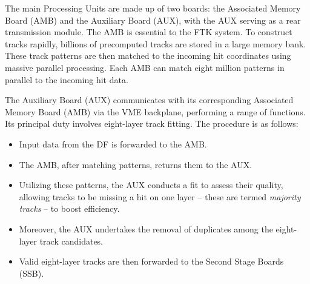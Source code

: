 \begin{table}[ht]
\centering
{}
\caption{Overview of the FTK system in the order in which the data are processed. 
The AUX appears in the table twice because of its dual functions \cite{Aad_2021}.}
\label{table:ftk_overview}
\end{table}

The main Processing Units are made up of two boards: the Associated Memory Board (AMB) and the Auxiliary Board (AUX), with the AUX serving as a rear transmission module. The AMB is essential to the FTK system. To construct tracks rapidly, billions of precomputed tracks are stored in a large memory bank. These track patterns are then matched to the incoming hit coordinates using massive parallel processing. Each AMB can match eight million patterns in parallel to the incoming hit data.

The Auxiliary Board (AUX) communicates with its corresponding Associated Memory Board (AMB) via the VME backplane, performing a range of functions. Its principal duty involves eight-layer track fitting. The procedure is as follows:
\begin{itemize}
    \item Input data from the DF is forwarded to the AMB.
    \item The AMB, after matching patterns, returns them to the AUX.
    \item Utilizing these patterns, the AUX conducts a fit to assess their quality, allowing tracks to be missing a hit on one layer -- these are termed \textit{majority tracks} -- to boost efficiency.
    \item Moreover, the AUX undertakes the removal of duplicates among the eight-layer track candidates.
    \item Valid eight-layer tracks are then forwarded to the Second Stage Boards (SSB).
\end{itemize}

